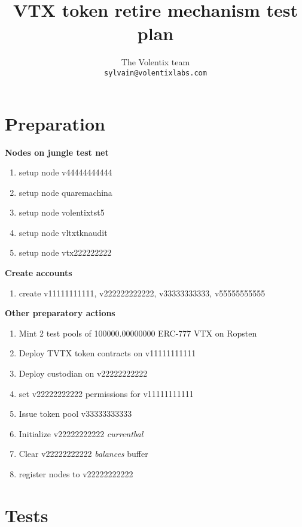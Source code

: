 \documentclass[]{article}
\title{VTX token retire mechanism test plan}
\author{
		The Volentix team\\
	\texttt{sylvain@volentixlabs.com}
}
\begin{document}
\maketitle


\section{Preparation}

\textbf{	Nodes on jungle test net}
	\begin{enumerate}
		\paragraph{}
		\item setup node v44444444444 
		\item setup node quaremachina
		\item setup node volentixtst5
		\item setup node vltxtknaudit
		\item setup node vtx222222222		
	  \end{enumerate}
\textbf{Create accounts}
\begin{enumerate}
\item create v11111111111, v222222222222, v33333333333, v55555555555
\end{enumerate} 
 \textbf{Other preparatory actions}
  		\begin{enumerate}
		  \item Mint 2 test pools of  100000.00000000 ERC-777 VTX on Ropsten
		  \item Deploy TVTX token contracts on v11111111111 
		  \item Deploy custodian on v22222222222
		  \item set v22222222222 permissions for v11111111111
		  \item Issue token pool v33333333333
		  \item Initialize v22222222222 \textit{currentbal}
		  \item Clear v22222222222 \textit{balances} buffer
		    \item register nodes to v22222222222\\
	 \end{enumerate}
  

\section{Tests}
\end{document}
